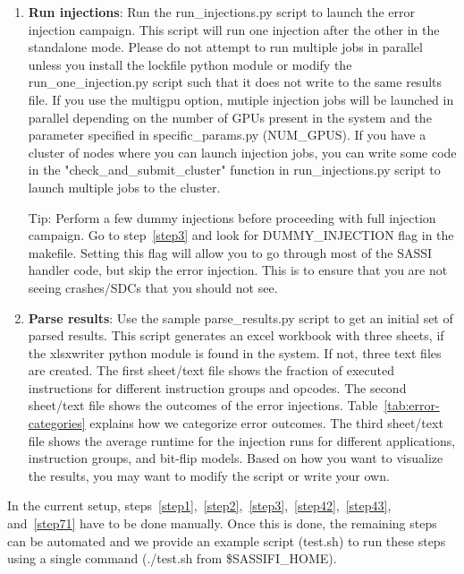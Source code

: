 \begin{enumerate}
\item {\bf Run injections}: 
		Run the run\_injections.py	script to launch the error injection campaign.
		This script will run one injection after the other in the standalone mode.
		Please do not attempt to run multiple jobs in parallel unless you install
		the lockfile python module or modify the run\_one\_injection.py script such
		that it does not write to the same results file.  If you use the multigpu
		option, mutiple injection jobs will be launched in parallel depending on
		the number of GPUs present in the system and the parameter  specified in
		specific\_params.py (NUM\_GPUS).  If you have a cluster of nodes where you
		can launch injection jobs, you can write some code in the
		"check\_and\_submit\_cluster" function in run\_injections.py script to
		launch multiple jobs to the cluster.  

		Tip: Perform a few dummy injections before proceeding with full injection
		campaign. Go to step~\ref{step3} and look for DUMMY\_INJECTION flag in the
		makefile. Setting this flag will allow you to go through most of the SASSI
		handler code, but skip the error injection. This is to ensure that you are
		not seeing crashes/SDCs that you should not see.
\label{step8}

\item {\bf Parse results}:
		Use the sample parse\_results.py script to get an initial set of parsed
		results.  This script generates an excel workbook with three sheets, if the
		xlsxwriter python module is found in the system. If not, three text files
		are created. The first sheet/text file shows the fraction of executed
		instructions for different instruction groups and opcodes. The second
		sheet/text file shows the outcomes of the error injections.
		Table~\ref{tab:error-categories} explains how we categorize error outcomes.
		The third sheet/text file shows the average runtime for the injection runs
		for different applications, instruction groups, and bit-flip models. Based
		on how you want to visualize the results, you may want to modify the script
		or write your own. 
\label{step9}

\end{enumerate}


In the current setup,
steps~\ref{step1},~\ref{step2},~\ref{step3},~\ref{step42},~\ref{step43},
and~\ref{step71} have to be done manually.  Once this is done, the remaining
steps can be automated and we provide an example script (test.sh) to run these
steps using a single command (./test.sh from \$SASSIFI\_HOME). 

